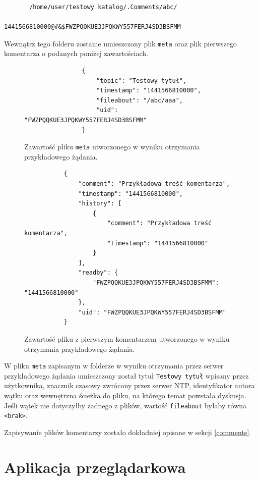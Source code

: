 \begin{verbatim}
       /home/user/testowy katalog/.Comments/abc/
                         1441566810000@#&$FWZPQQKUE3JPQKWY557FERJ4SD3BSFMM
\end{verbatim}

Wewnątrz tego folderu zostanie umieszczony plik \texttt{meta} oraz plik pierwszego komentarza o podanych poniżej zawartościach.

\begin{figure}[htb]
\begin{verbatim}
                {
                    "topic": "Testowy tytuł", 
                    "timestamp": "1441566810000", 
                    "fileabout": "/abc/aaa", 
                    "uid": "FWZPQQKUE3JPQKWY557FERJ4SD3BSFMM"
                }
\end{verbatim}
  \caption{Zawartość pliku \texttt{meta} utworzonego w wyniku otrzymania przykładowego żądania.}
\end{figure}

\begin{figure}[htb]
\begin{verbatim}
           {
               "comment": "Przykładowa treść komentarza", 
               "timestamp": "1441566810000", 
               "history": [
                   {
                       "comment": "Przykładowa treść komentarza", 
                       "timestamp": "1441566810000"
                   }
               ], 
               "readby": {
                   "FWZPQQKUE3JPQKWY557FERJ4SD3BSFMM": "1441566810000"
               }, 
               "uid": "FWZPQQKUE3JPQKWY557FERJ4SD3BSFMM"
           }
\end{verbatim}
  \caption{Zawartość pliku z pierwszym komentarzem utworzonego w wyniku otrzymania przykładowego żądania.}
\end{figure}

W pliku \texttt{meta} zapisanym w folderze w wyniku otrzymania przez serwer przykładowego żądania umieszczony został tytuł \texttt{Testowy tytuł} wpisany przez użytkownika, znacznik czasowy zwrócony przez serwer NTP, identyfikator autora wątku oraz wewnętrzna ścieżka do pliku, na którego temat powstała dyskusja. Jeśli wątek nie dotyczyłby żadnego z plików, wartość \texttt{fileabout} byłaby równa \texttt{<brak>}.

Zapisywanie plików komentarzy zostało dokładniej opisane w sekcji \ref{comments}.

\section{Aplikacja przeglądarkowa}

